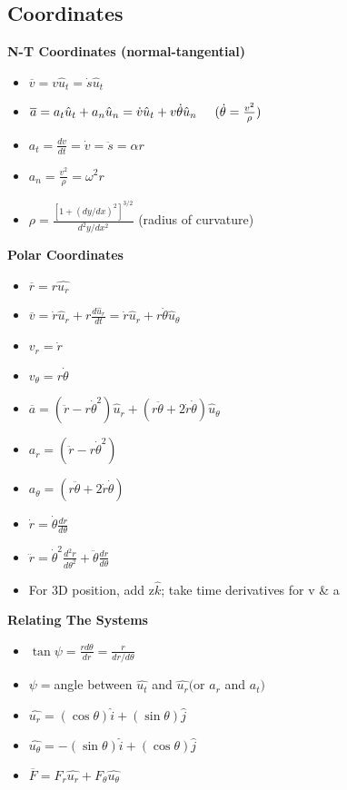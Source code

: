 \documentclass [10pt] {article}
\begin{document}
\begin{multicols*}{2}
\section{Coordinates}
\textbf{N-T Coordinates (normal-tangential)}
	\begin{itemize}
		\item $\overline{v} = v\textbf{$\hat{u}_t$} = \dot{s}\textbf{$\hat{u}_t$}$
		\item $\overline{a} = a_t\textbf{$\hat{u}_t$} + a_n\textbf{$\hat{u}_n$} = \dot{v}\textbf{$\hat{u}_t$} + v\dot{\theta}\textbf{$\hat{u}_n$} \hspace{5mm} (\dot{\theta} = \frac{v^2}{\rho})$
		\item $a_t = \frac{dv}{dt} = \dot{v} = \ddot{s} = \alpha r$
		\item $a_n = \frac{v^2}{\rho} = \omega^2r $
		\item $\rho = \frac{[1+(dy/dx)^2]^{3/2}}{d^2y/dx^2}$ (radius  of  curvature)\\
	\end{itemize}
\textbf{Polar Coordinates} 
	\begin{itemize}
		\item $\overline{r} = r\hat{u_r}$
		\item $\overline{v} = \dot{r}\textbf{$\hat{u}_r$} + r\frac{d\textbf{$\hat{u}_r$}}{dt} = \dot{r}\textbf{$\hat{u}_r$} + r\dot{\theta}\textbf{$\hat{u}_\theta$} $
		\item $v_r = \dot{r}$
		\item $v_\theta = r\dot{\theta}$
		\item $ \overline{a} = (\ddot{r} - r\dot{\theta}^2)\textbf{$\hat{u}_r$} + (r\ddot{\theta} + 2\dot{r}\dot{\theta})\textbf{$\hat{u}_\theta$} $
		\item $a_r = (\ddot{r} - r\dot{\theta}^2) $
		\item $a_\theta = (r\ddot{\theta} + 2\dot{r}\dot{\theta}) $
		\item $\dot{r} = \dot{\theta}\frac{dr}{d\theta} $
		\item $\ddot{r} = \dot{\theta}^2\frac{d^2r}{d\theta^2} + \ddot{\theta}\frac{dr}{d\theta}$
		\item For 3D position, add z$\hat{k}$; take time derivatives for v \& a \\
	\end{itemize}
\textbf{Relating The Systems} 
	\begin{itemize}
		\item $\tan{\psi} = \frac{r d\theta}{dr} = \frac{r}{dr/d\theta} $
		\item $ \psi = $angle between $ \hat{u_t} $ and $ \hat{u_r} ($or $ a_r $ and $ a_t) $
		\item $\hat{u_r} = (\cos\theta)\hat{i} + (\sin\theta)\hat{j} $
		\item $\hat{u_\theta} = -(\sin\theta)\hat{i} + (\cos\theta)\hat{j} $
		\item $\overline{F} = F_r\hat{u_r} + F_\theta\hat{u_\theta}$
	\end{itemize}

\end{multicols*}
\end{document}
